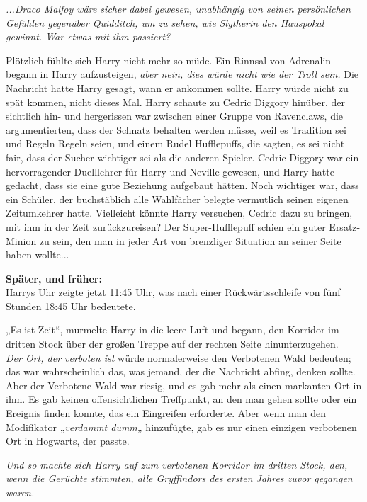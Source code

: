 {\emph{...Draco Malfoy wäre sicher dabei gewesen, unabhängig von seinen persönlichen Gefühlen gegenüber Quidditch, um zu sehen, wie Slytherin den Hauspokal gewinnt. War etwas mit ihm passiert?}

Plötzlich fühlte sich Harry nicht mehr so müde. Ein Rinnsal von Adrenalin begann in Harry aufzusteigen, \emph{aber nein, dies würde nicht wie der Troll sein.} Die Nachricht hatte Harry gesagt, wann er ankommen sollte. Harry würde nicht zu spät kommen, nicht dieses Mal. Harry schaute zu Cedric Diggory hinüber, der sichtlich hin- und hergerissen war zwischen einer Gruppe von Ravenclaws, die argumentierten, dass der Schnatz behalten werden müsse, weil es Tradition sei und Regeln Regeln seien, und einem Rudel Hufflepuffs, die sagten, es sei nicht fair, dass der Sucher wichtiger sei als die anderen Spieler. Cedric Diggory war ein hervorragender Duelllehrer für Harry und Neville gewesen, und Harry hatte gedacht, dass sie eine gute Beziehung aufgebaut hätten. Noch wichtiger war, dass ein Schüler, der buchstäblich alle Wahlfächer belegte vermutlich seinen eigenen Zeitumkehrer hatte. Vielleicht könnte Harry versuchen, Cedric dazu zu bringen, mit ihm in der Zeit zurückzureisen? Der Super-Hufflepuff schien ein guter Ersatz-Minion zu sein, den man in jeder Art von brenzliger Situation an seiner Seite haben wollte...

\textbf{Später, und früher:}\\ Harrys Uhr zeigte jetzt 11:45 Uhr, was nach einer Rückwärtsschleife von fünf Stunden 18:45 Uhr bedeutete.

„Es ist Zeit“, murmelte Harry in die leere Luft und begann, den Korridor im dritten Stock über der großen Treppe auf der rechten Seite hinunterzugehen.\\ \emph{Der Ort, der verboten ist} würde normalerweise den Verbotenen Wald bedeuten; das war wahrscheinlich das, was jemand, der die Nachricht abfing, denken sollte.\\ Aber der Verbotene Wald war riesig, und es gab mehr als einen markanten Ort in ihm. Es gab keinen offensichtlichen Treffpunkt, an den man gehen sollte oder ein Ereignis finden konnte, das ein Eingreifen erforderte. Aber wenn man den Modifikator „\emph{verdammt dumm„} hinzufügte, gab es nur einen einzigen verbotenen Ort in Hogwarts, der passte.

\emph{Und so machte sich Harry auf zum verbotenen Korridor im dritten Stock, den, wenn die Gerüchte stimmten, alle Gryffindors des ersten Jahres zuvor gegangen waren.}

}
